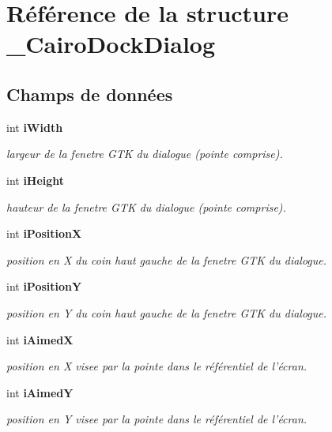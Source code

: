 \section{Référence de la structure \_\-CairoDockDialog}
\label{struct__CairoDockDialog}
\subsection*{Champs de données}
\begin{CompactItemize}
\item 
int {\bf iWidth}
\begin{CompactList}\small\item\em largeur de la fenetre GTK du dialogue (pointe comprise). \item\end{CompactList}\item 
int {\bf iHeight}
\begin{CompactList}\small\item\em hauteur de la fenetre GTK du dialogue (pointe comprise). \item\end{CompactList}\item 
int {\bf iPositionX}
\begin{CompactList}\small\item\em position en X du coin haut gauche de la fenetre GTK du dialogue. \item\end{CompactList}\item 
int {\bf iPositionY}
\begin{CompactList}\small\item\em position en Y du coin haut gauche de la fenetre GTK du dialogue. \item\end{CompactList}\item 
int {\bf iAimedX}
\begin{CompactList}\small\item\em position en X visee par la pointe dans le référentiel de l'écran. \item\end{CompactList}\item 
int {\bf iAimedY}
\begin{CompactList}\small\item\em position en Y visee par la pointe dans le référentiel de l'écran. \item\end{CompactList}\item 

\end{CompactItemize}
